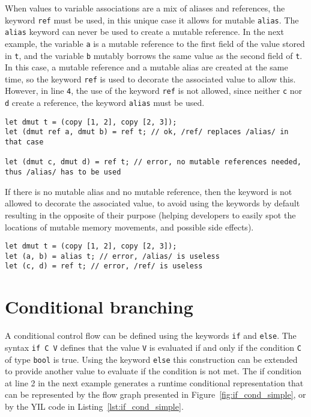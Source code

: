 When values to variable associations are a mix of aliases and references, the
keyword \texttt{ref} must be used, in this unique case it allows for mutable
\texttt{alias}. The \texttt{alias} keyword can never be used to create a mutable
reference. In the next example, the variable \texttt{a} is a mutable reference
to the first field of the value stored in \texttt{t}, and the variable
\texttt{b} mutably borrows the same value as the second field of \texttt{t}. In
this case, a mutable reference and a mutable alias are created at the same time,
so the keyword \texttt{ref} is used to decorate the associated value to allow
this. However, in line \texttt{4}, the use of the keyword \texttt{ref} is not
allowed, since neither \texttt{c} nor \texttt{d} create a reference, the keyword
\texttt{alias} must be used.

\begin{lstlisting}[style=coloredverbatim]
let dmut t = (copy [1, 2], copy [2, 3]);
let (dmut ref a, dmut b) = ref t; // ok, /ref/ replaces /alias/ in that case

let (dmut c, dmut d) = ref t; // error, no mutable references needed, thus /alias/ has to be used
\end{lstlisting}

If there is no mutable alias and no mutable reference, then the keyword is not
allowed to decorate the associated value, to avoid using the keywords by default
resulting in the opposite of their purpose (helping developers to easily spot
the locations of mutable memory movements, and possible side effects).

\begin{lstlisting}[style=coloredverbatim]
let dmut t = (copy [1, 2], copy [2, 3]);
let (a, b) = alias t; // error, /alias/ is useless
let (c, d) = ref t; // error, /ref/ is useless
\end{lstlisting}

\section{Conditional branching}%
\label{sec:if_else}

A conditional control flow can be defined using the keywords \texttt{if} and
\texttt{else}. The syntax \texttt{if C V} defines that the value \texttt{V} is
evaluated if and only if the condition \texttt {C} of type \texttt {bool} is
true. Using the keyword \texttt{else} this construction can be extended to
provide another value to evaluate if the condition is not met. The if condition
at line 2 in the next example generates a runtime conditional representation
that can be represented by the flow graph presented in
Figure~\ref{fig:if_cond_simple}, or by the YIL code in
Listing~\ref{lst:if_cond_simple}.

